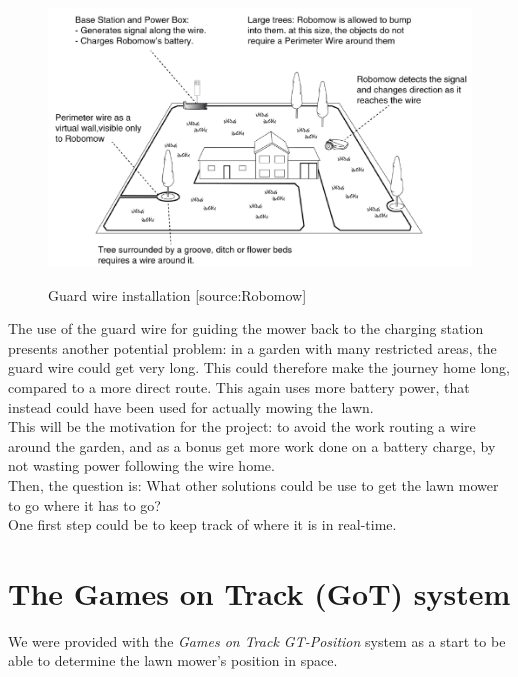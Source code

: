  
\begin{figure}[H]
\centering
\includegraphics[scale=0.6]{figures/robomow.png} 
\label{fig:robomow}
\caption{Guard wire installation [source:Robomow]} 
\end{figure}
\noindent

The use of the guard wire for guiding the mower back to the charging station presents another potential problem: in a garden with many restricted areas, the guard wire could get very long. This could therefore make the journey home long, compared to a more direct route. This again uses more battery power, that instead could have been used for actually mowing the lawn.\\

\noindent
This will be the motivation for the project: to avoid the work routing a wire around the garden, and as a bonus get more work done on a battery charge, by not wasting power following the wire home.\\

\noindent
Then, the question is: What other solutions could be use to get the lawn mower to go where it has to go? \\
One first step could be to keep track of where it is in real-time.

\section{The Games on Track (GoT) system}
We were provided with the \emph{Games on Track GT-Position} system as a start to be able to determine the lawn mower's position in space.

